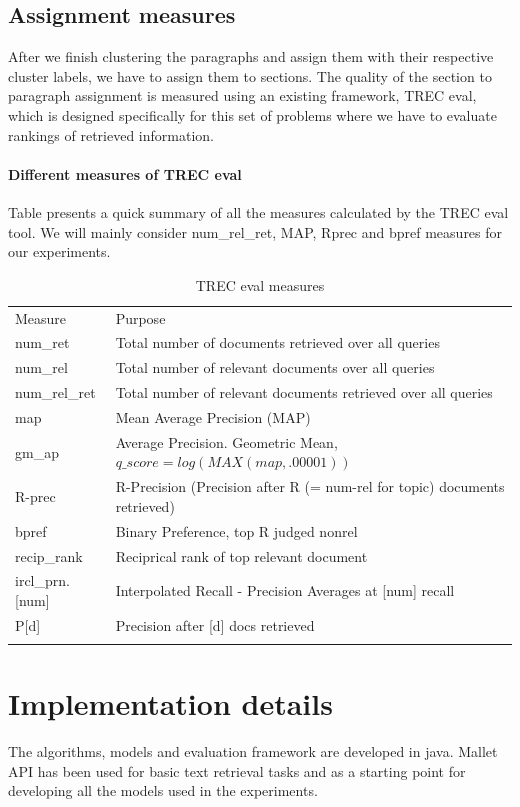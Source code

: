 \subsection{Assignment measures}
\label{sec:6}
After we finish clustering the paragraphs and assign them with their respective cluster labels, we have to assign them to sections. The quality of the section to paragraph assignment is measured using an existing framework, TREC eval, which is designed specifically for this set of problems where we have to evaluate rankings of retrieved information.
\paragraph{Different measures of TREC eval} Table presents a quick summary of all the measures calculated by the TREC eval tool. We will mainly consider num\_rel\_ret, MAP, Rprec and bpref measures for our experiments.
\begin{table}
\caption{TREC eval measures}
\label{tab:treceval}       %
\begin{tabular}{l|l}
\hline\noalign{\smallskip}
Measure & Purpose  \\
\noalign{\smallskip}\hline\noalign{\smallskip}
num\_ret & Total number of documents retrieved over all queries \\
\hline
num\_rel & Total number of relevant documents over all queries \\
\hline
num\_rel\_ret & Total number of relevant documents retrieved over all queries \\
\hline
map & Mean Average Precision (MAP) \\
\hline
gm\_ap & Average Precision. Geometric Mean, $q\_score=log(MAX(map,.00001))$ \\
\hline
R-prec & R-Precision (Precision after R (= num-rel for topic) documents retrieved) \\
\hline
bpref & Binary Preference, top R judged nonrel \\
\hline
recip\_rank & Reciprical rank of top relevant document \\
\hline
ircl\_prn.[num] & Interpolated Recall - Precision Averages at [num] recall \\
\hline
P[d] & Precision after [d] docs retrieved \\
\noalign{\smallskip}\hline
\end{tabular}
\end{table}
\section{Implementation details}
\label{sec:implementation}
The algorithms, models and evaluation framework are developed in java. Mallet API has been used for basic text retrieval tasks and as a starting point for developing all the models used in the experiments.

